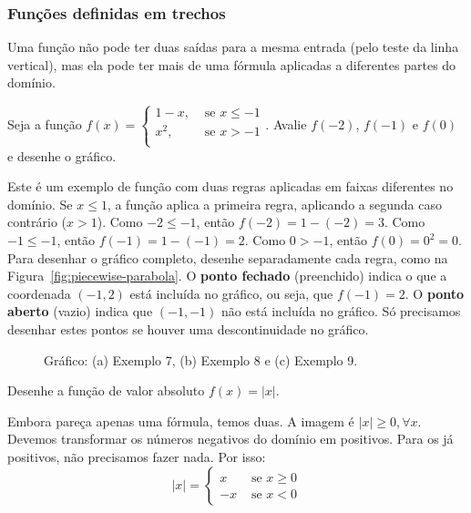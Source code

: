 \subsubsection{Funções definidas em trechos}

Uma função não pode ter duas saídas para a mesma entrada (pelo teste da linha vertical), mas ela pode ter mais de uma fórmula aplicadas a diferentes partes do domínio.

 Seja a função $\displaystyle f(x) = \begin{cases}
1-x, & \text{ se } x \leq -1\\
x^2, & \text{ se } x > -1\\
\end{cases}$.
Avalie $f(-2)$, $f(-1)$ e $f(0)$ e desenhe o gráfico.

\solution
Este é um exemplo de função com duas regras aplicadas em faixas diferentes no domínio. Se $x \leq 1$, a função aplica a primeira regra, aplicando a segunda caso contrário ($x > 1$). Como $-2 \leq -1$, então $f(-2) = 1-(-2) = 3$. Como $-1\leq -1$, então $f(-1)=1-(-1)=2$. Como $0 > -1$, então $f(0) = 0^2 = 0$. Para desenhar o gráfico completo, desenhe separadamente cada regra, como na Figura~\ref{fig:piecewise-parabola}. O \textbf{ponto fechado} (preenchido) indica o que a coordenada $(-1,2)$ está incluída no gráfico, ou seja, que $f(-1) = 2$. O \textbf{ponto aberto} (vazio) indica que $(-1,-1)$ não está incluída no gráfico. Só precisamos desenhar estes pontos se houver uma descontinuidade no gráfico.
\vspace{-0.7cm}\begin{figure}[!ht]
  \centering
  \caption{Gráfico: (a) Exemplo 7, (b) Exemplo 8 e (c) Exemplo 9.}
  \vspace{-0.5cm}
\end{figure}

 Desenhe a função de valor absoluto $f(x) = |x|$.

\solution
Embora pareça apenas uma fórmula, temos duas. A imagem é $|x|\geq 0, \forall x$. Devemos transformar os números negativos do domínio em positivos. Para os já positivos, não precisamos fazer nada. Por isso: $$\displaystyle |x|=\begin{cases}
x &\text{ se } x \geq 0\\
-x & \text{ se } x < 0
\end{cases}$$

